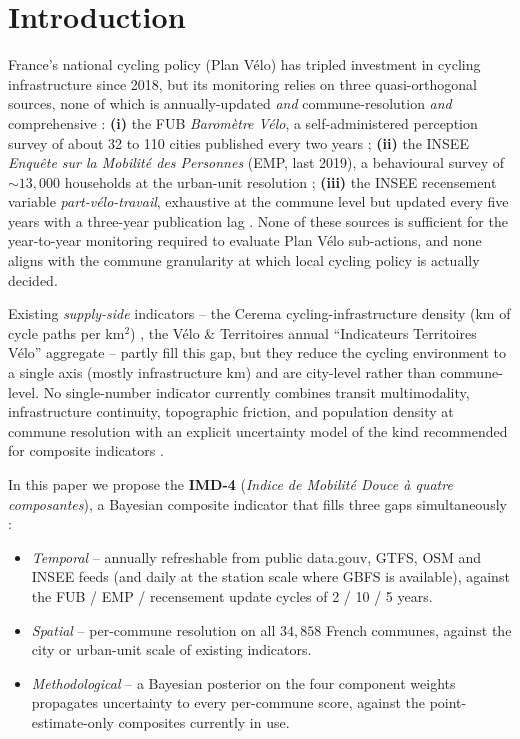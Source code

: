 \documentclass[11pt,a4paper]{article}
\begin{document}
\section{Introduction}
\label{sec:intro}

France's national cycling policy (Plan V\'elo)
\citep{PlanVelo2018} has tripled investment in cycling
infrastructure since 2018, but its monitoring relies on three
quasi-orthogonal sources, none of which is annually-updated
\emph{and} commune-resolution \emph{and} comprehensive :
\textbf{(i)} the FUB \emph{Barom\`etre V\'elo}, a self-administered
perception survey of about 32 to 110 cities published every two
years \citep{FUB2023} ;
\textbf{(ii)} the INSEE \emph{Enqu\^ete sur la Mobilit\'e des
Personnes} (EMP, last 2019), a behavioural survey of $\sim 13{,}000$
households at the urban-unit resolution \citep{EMP2019} ;
\textbf{(iii)} the INSEE recensement variable \emph{part-v\'elo-travail},
exhaustive at the commune level but updated every five years with a
three-year publication lag \citep{INSEEMobPro2022}.  None of these sources is sufficient for
the year-to-year monitoring required to evaluate Plan V\'elo
sub-actions, and none aligns with the commune granularity at which
local cycling policy is actually decided.

Existing \emph{supply-side} indicators -- the Cerema cycling-infrastructure
density (km of cycle paths per km$^2$) \citep{Cerema2021Velo}, the
V\'elo \& Territoires annual ``Indicateurs Territoires V\'elo''
aggregate \citep{VeloTerritoires2023} -- partly fill this gap,
but they reduce the cycling environment to a single axis (mostly
infrastructure km) and are city-level rather than commune-level.  No
single-number indicator currently combines transit multimodality,
infrastructure continuity, topographic friction, and population
density at commune resolution with an explicit uncertainty model
of the kind recommended for composite indicators
\citep{OECD2008,Saisana2005}.

In this paper we propose the \textbf{IMD-4} (\emph{Indice de Mobilit\'e
Douce \`a quatre composantes}), a Bayesian composite indicator that
fills three gaps simultaneously :

\begin{itemize}[label=$\bullet$,leftmargin=*]
    \item \emph{Temporal} -- annually refreshable from public
          data.gouv, GTFS, OSM and INSEE feeds (and daily at the
          station scale where GBFS is available), against the FUB /
          EMP / recensement update cycles of 2 / 10 / 5 years.
    \item \emph{Spatial} -- per-commune resolution on all $34{,}858$
          French communes, against the city or urban-unit scale of
          existing indicators.
    \item \emph{Methodological} -- a Bayesian posterior on the
          four component weights propagates uncertainty to every
          per-commune score, against the point-estimate-only
          composites currently in use.
\end{itemize}
\end{document}
